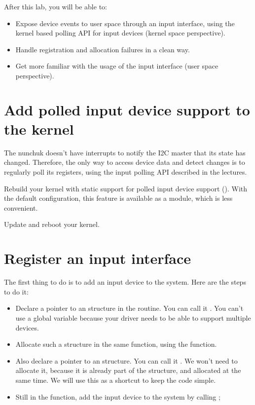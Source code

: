 
After this lab, you will be able to:

\begin{itemize}
\item Expose device events to user space through an input interface,
      using the kernel based polling API for input devices
      (kernel space perspective).
\item Handle registration and allocation failures in a clean
      way.
\item Get more familiar with the usage of the input interface
      (user space perspective).
\end{itemize}

\section{Add polled input device support to the kernel}

The nunchuk doesn't have interrupts to notify the I2C master that
its state has changed. Therefore, the only way to access device data
and detect changes is to regularly poll its registers, using the input
polling API described in the lectures.

Rebuild your kernel with static support for polled input device support
(). With the default configuration, this
feature is available as a module, which is less convenient.

Update and reboot your kernel.

\section{Register an input interface}

The first thing to do is to add an input device to the system. Here are
the steps to do it:

\begin{itemize}
\item Declare a pointer to an  structure in the
       routine. You can call it .
      You can't use a global variable because your driver needs to be
      able to support multiple devices.
\item Allocate such a structure in the same function, using the
       function.
\item Also declare a pointer to an  structure. You can
      call it . We won't need to allocate it, because it
      is already part of the  structure,
      and allocated at the same time.
      We will use this as a shortcut to keep the code simple.
\item Still in the  function, add the input device to
      the system by calling ;
\end{itemize}

